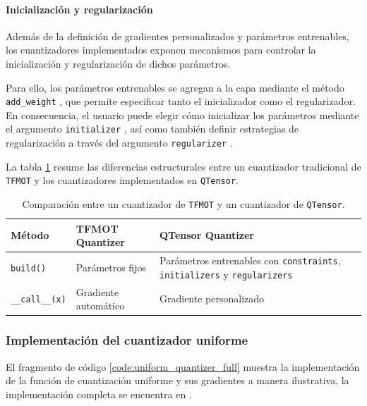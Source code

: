 \paragraph{Inicialización y regularización}

Además de la definición de gradientes personalizados y parámetros entrenables, los cuantizadores implementados exponen mecanismos para controlar la inicialización y regularización de dichos parámetros.

Para ello, los parámetros entrenables se agregan a la capa mediante el método \texttt{add\_weight} \cite{tensorflow_add_weight_api}, que permite especificar tanto el inicializador como el regularizador. En consecuencia, el usuario puede elegir cómo inicializar los parámetros mediante el argumento \texttt{initializer} \cite{tensorflow_initializers_api}, así como también definir estrategias de regularización a través del argumento \texttt{regularizer} \cite{tensorflow_regularizers_api}.

La tabla \ref{tab:quantizer_comparison} resume las diferencias estructurales entre un cuantizador tradicional de \texttt{TFMOT} y los cuantizadores implementados en \texttt{QTensor}.

\begin{table}[htbp]
    \centering
    \caption{Comparación entre un cuantizador de \texttt{TFMOT} y un cuantizador de \texttt{QTensor}.}
    \label{tab:quantizer_comparison}
    \begin{tabularx}{\textwidth}{l X X}
        \toprule
        \textbf{Método} & \textbf{TFMOT Quantizer} & \textbf{QTensor Quantizer} \\
        \midrule
        \texttt{build()} &
        Parámetros fijos &
        Parámetros entrenables con
        \texttt{constraints}, \texttt{initializers} y \texttt{regularizers} \\
        \midrule
        \texttt{\_\_call\_\_(x)} &
        Gradiente automático &
        Gradiente personalizado \\
        \bottomrule
    \end{tabularx}
\end{table}

\subsubsection{Implementación del cuantizador uniforme}

El fragmento de código \ref{code:uniform_quantizer_full} muestra la implementación de la función de cuantización uniforme y sus gradientes a manera ilustrativa, la implementación completa se encuentra en \cite{qtensor_uniform_quantizer}.

